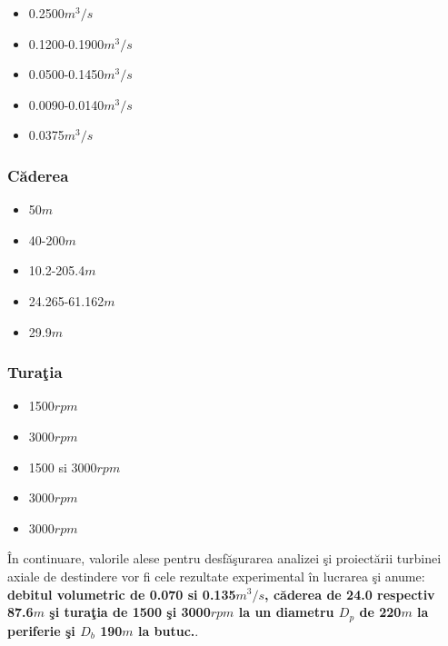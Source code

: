 \begin{itemize}
	\item 0.2500$\si{m^3/s}$ \cite{gentner2000experimentelle}
	\item 0.1200-0.1900$\si{m^3/s}$ \cite{GREES_2014}
	\item 0.0500-0.1450$\si{m^3/s}$ \cite{susanhub}
	\item 0.0090-0.0140$\si{m^3/s}$ \cite{biner2016engineering}
	\item 0.0375$\si{m^3/s}$ \cite{hasmatuchi2014new}
\end{itemize}


\subsubsection{C\u{a}derea}

\begin{itemize}
	\item 50$\si{m}$ \cite{gentner2000experimentelle}
	\item 40-200$\si{m}$ \cite{GREES_2014}
	\item 10.2-205.4$\si{m}$ \cite{susanhub}
	\item 24.265-61.162$\si{m}$ \cite{biner2016engineering}
	\item 29.9$\si{m}$ \cite{hasmatuchi2014new}
\end{itemize}


\subsubsection{Tura\c{t}ia}

\begin{itemize}
	\item 1500$\si{rpm}$ \cite{gentner2000experimentelle}
	\item 3000$\si{rpm}$ \cite{GREES_2014}
	\item 1500 si 3000$\si{rpm}$ \cite{susanhub}
	\item 3000$\si{rpm}$ \cite{biner2016engineering}
	\item 3000$\si{rpm}$ \cite{hasmatuchi2014new}
\end{itemize}

\^{I}n continuare, valorile alese pentru desf\u{a}\c{s}urarea analizei \c{s}i proiect\u{a}rii turbinei axiale de destindere vor fi cele rezultate experimental \^{i}n lucrarea \cite{susanhub} \c{s}i anume: \textbf{debitul volumetric de 0.070 si 0.135$\si{m^3/s}$, c\u{a}derea de 24.0 respectiv 87.6$\si{m}$ \c{s}i tura\c{t}ia de 1500 \c{s}i 3000$\si{rpm}$ la un diametru $D_p$ de 220$\si{m}$ la periferie \c{s}i $D_b$ 190$\si{m}$ la butuc.}.

\clearpage